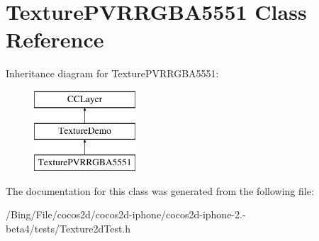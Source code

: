 \hypertarget{interface_texture_p_v_r_r_g_b_a5551}{\section{Texture\-P\-V\-R\-R\-G\-B\-A5551 Class Reference}
\label{interface_texture_p_v_r_r_g_b_a5551}
}
Inheritance diagram for Texture\-P\-V\-R\-R\-G\-B\-A5551\-:\begin{figure}[H]
\begin{center}
\leavevmode
\includegraphics[height=3.000000cm]{interface_texture_p_v_r_r_g_b_a5551}
\end{center}
\end{figure}


The documentation for this class was generated from the following file\-:\begin{DoxyCompactItemize}
\item 
/\-Bing/\-File/cocos2d/cocos2d-\/iphone/cocos2d-\/iphone-\/2.-\/beta4/tests/Texture2d\-Test.\-h\end{DoxyCompactItemize}
